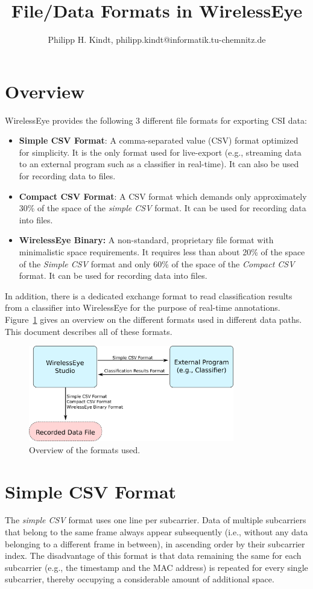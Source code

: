 \documentclass{article}
\title{File/Data Formats in WirelessEye}
\author{Philipp H. Kindt, philipp.kindt@informatik.tu-chemnitz.de}
\begin{document}
\maketitle
	\section{Overview}
WirelessEye provides the following 3 different file formats for exporting CSI data:
\begin{itemize}
	\item \textbf{Simple CSV Format}: A comma-separated value (CSV) format optimized for simplicity. It is the only format used for live-export (e.g., streaming data to an external program such as a classifier in real-time). It can also be used for recording data to files.
	\item \textbf{Compact CSV Format}: A CSV format which demands only approximately 30\% of the space of the \textit{simple CSV} format. It can be used for recording data into files.
	\item \textbf{WirelessEye Binary:} A non-standard, proprietary file format with minimalistic space requirements. It requires less than about 20\% of the space of the \textit{Simple CSV} format and only 60\% of the space of the \textit{Compact CSV} format. It can be used for recording data into files. 
\end{itemize}
In addition, there is a dedicated exchange format to read classification results from a classifier into WirelessEye for the purpose of real-time annotations. Figure~\ref{fig:formatOverview} gives an overview on the different formats used in different data paths. This document describes all of these formats.
\begin{figure}
	\centering
	\vspace*{-.5cm}
	\includegraphics[width=0.8\textwidth]{images/formatOverview.png}
	\caption{Overview of the formats used.}
	\label{fig:formatOverview}
\end{figure}
\section{Simple CSV Format}
The \textit{simple CSV} format uses one line per subcarrier. Data of multiple subcarriers that belong to the same frame always appear subsequently (i.e., without any data belonging to a different frame in between), in ascending order by their subcarrier index. The disadvantage of this format is that data remaining the same for each subcarrier (e.g., the timestamp and the MAC address) is repeated for every single subcarrier, thereby occupying a considerable amount of additional space.
\end{document}
